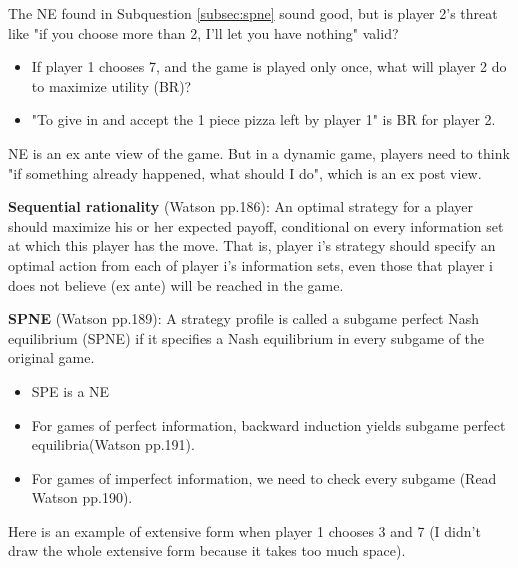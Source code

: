 \documentclass{article}
\begin{document}
\begin{mdframed}[backgroundcolor=blue!20,linecolor=white]

The NE found in Subquestion \ref{subsec:spne} sound good, but is player 2's threat like "if you choose more than 2, I'll let you have nothing" valid? 

\begin{itemize}
\item If player 1 chooses 7, and the game is played only once, what will player 2 do to maximize  utility (BR)?
\item "To give in and accept the 1 piece pizza left by player 1" is BR for player 2.
\end{itemize}

NE is an ex ante view of the game. But in a dynamic game, players need to think "if something already happened, what should I do", which is an ex post view.

\medskip

\textbf{Sequential rationality} (Watson pp.186): An optimal strategy for a player should maximize
his or her expected payoff, conditional on every information set
at which this player has the move. That is, player i’s strategy should
specify an optimal action from each of player i’s information sets, even
those that player i does not believe (ex ante) will be reached in the game.

\medskip

\textbf{SPNE} (Watson pp.189): A strategy profile is called a subgame perfect Nash equilibrium (SPNE) if it specifies a Nash equilibrium in every subgame of the original game.

\begin{itemize}
\item  SPE is a NE
\item  For games of perfect information,  backward induction yields subgame perfect equilibria(Watson pp.191).
\item  For games of imperfect information, we need to check every subgame (Read Watson pp.190).
\end{itemize}

Here is an example of extensive form when player 1 chooses 3 and 7 (I didn't draw the 
whole extensive form because it takes too much space).


\end{mdframed}
\end{document}
